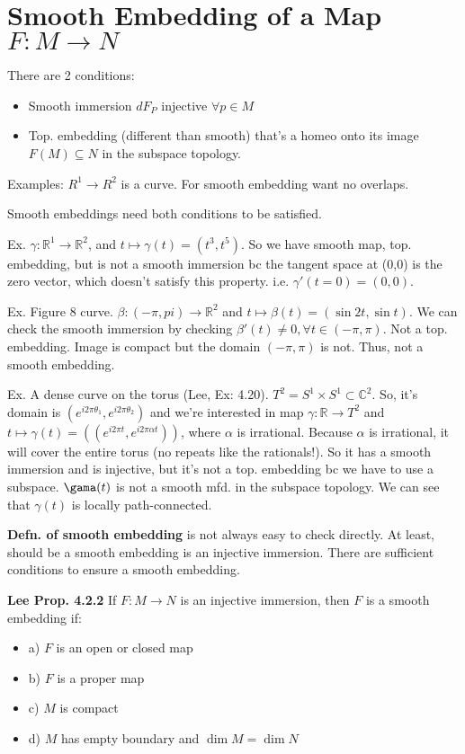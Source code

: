 \documentclass[12pt,letterpaper]{article}
\begin{document}
\section*{Smooth Embedding of a Map $F:M \rightarrow N$}
There are 2 conditions:
\begin{itemize}
    \item Smooth immersion $dF_P$ injective $\forall p \in M$
    \item Top. embedding (different than smooth) that's a homeo onto its image $F(M) \subseteq N$ in the subspace topology. 
\end{itemize}
Examples: $R^1 \rightarrow R^2$ is a curve. For smooth embedding want no overlaps.

Smooth embeddings need both conditions to be satisfied. 

Ex. $\gamma: \mathbb{R}^1 \rightarrow \mathbb{R}^2$, and $t \mapsto \gamma (t) = (t^3, t^5).$ So we have smooth map, top. embedding, but is not a smooth immersion bc the tangent space at (0,0) is the zero vector, which doesn't satisfy this property. i.e. $\gamma ' (t=0)= (0,0)$. 

Ex. Figure 8 curve. $\beta: (-\pi, pi) \rightarrow \mathbb{R}^2$ and $t \mapsto \beta (t) = (\sin 2t, \sin t)$. We can check the smooth immersion by checking $\beta '(t) \neq 0, \forall t \in (-\pi, \pi)$. Not a top. embedding. Image is compact but the domain $(-\pi, \pi)$ is not. Thus, not a smooth embedding.

Ex. A dense curve on the torus (Lee, Ex: 4.20). $T^2 = S^1 \times S^1 \subset \mathbb{C}^2$. So, it's domain is $(e^{i2 \pi \theta_1}, e^{i2\pi \theta_2})$ and we're interested in map $\gamma: \mathbb{R}\rightarrow T^2$ and $t \mapsto \gamma (t) = ((e^{i2 \pi t}, e^{i2\pi \alpha t}))$, where $\alpha$ is irrational. Because $\alpha$ is irrational, it will cover the entire torus (no repeats like the rationals!). So it has a smooth immersion and is injective, but it's not a top. embedding bc we have to use a subspace. $\gama (t)$ is not a smooth mfd. in the subspace topology. We can see that $\gamma (t)$ is locally path-connected. 

\textbf{Defn. of smooth embedding} is not always easy to check directly. At least, should be a smooth embedding is an injective immersion. There are sufficient conditions to ensure a smooth embedding. 

\textbf{Lee Prop. 4.2.2} If $F: M \rightarrow N$ is an injective immersion, then $F$ is a smooth embedding if:
\begin{itemize}
    \item a) $F$ is an open or closed map
    \item b) $F$ is a proper map
    \item c) $M$ is compact
    \item d) $M$ has empty boundary and $\dim M = \dim N$
\end{itemize}
\end{document}
